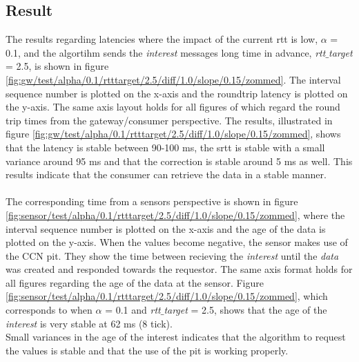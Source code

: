 \subsection{Result}
The results regarding latencies where the impact of the current rtt is low, $\alpha$ = 0.1, and the algortihm sends the \textit{interest} messages long time in advance, \textit{rtt$\_$target} = 2.5, is shown in figure \ref{fig:gw/test/alpha/0.1/rtttarget/2.5/diff/1.0/slope/0.15/zommed}. The interval sequence number is plotted on the x-axis and the roundtrip latency is plotted on the y-axis. The same axis layout holds for all figures of which regard the round trip times from the gateway/consumer perspective. 
The results, illustrated in figure \ref{fig:gw/test/alpha/0.1/rtttarget/2.5/diff/1.0/slope/0.15/zommed}, shows that the latency is stable between 90-100 ms, the srtt is stable with a small variance around 95 ms and that the correction is stable around 5 ms as well. This results indicate that the consumer can retrieve the data in a stable manner.\\\\
The corresponding time from a sensors perspective is shown in figure \ref{fig:sensor/test/alpha/0.1/rtttarget/2.5/diff/1.0/slope/0.15/zommed}, where the interval sequence number is plotted on the x-axis and the age of the data is plotted on the y-axis. When the values become negative, the sensor makes use of the CCN pit. They show the time between recieving the \textit{interest} until the \textit{data} was created and responded towards the requestor. The same axis format holds for all figures regarding the age of the data at the sensor. Figure \ref{fig:sensor/test/alpha/0.1/rtttarget/2.5/diff/1.0/slope/0.15/zommed}, which corresponds to when $\alpha$ = 0.1 and \textit{rtt$\_$target} = 2.5, shows that the age of the \textit{interest} is very stable at 62 ms (8 tick). \\Small variances in the age of the interest indicates that the algorithm to request the values is stable and that the use of the pit is working properly.\\\\
